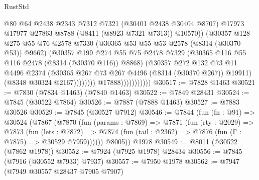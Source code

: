\begin{lexlean}{RustStd}
\begin{coremodule}
                                      @80
                                      @64
                                      @2438
                                      @2343
                                      @7312
                                      @7321
                                      (@30401 @2438 @30404 @8707)
                                      @17973
                                      @17977
                                      @27863
                                      @8788
                                      (@8411 (@8923 @7321 @7313))
                                      @10570))
                                  (@30357
                                    @128
                                    @275
                                    @55
                                    @76
                                    @2578
                                    @7330
                                    (@30365 @53 @55 @53 @2578 (@8314 (@30370 @53)) @9662)
                                    (@30357
                                      @199
                                      @274
                                      @55
                                      @75
                                      @2478
                                      @7329
                                      (@30365 @116 @55 @116 @2478 (@8314 (@30370 @116)) @8868)
                                      (@30357
                                        @272
                                        @132
                                        @73
                                        @11
                                        @4496
                                        @2374
                                        (@30365 @267 @73 @267 @4496 (@8314 (@30370 @267)) @19911)
                                        (@8348 @30324 @2167))))))))
                          @17888)))))))))))
@30517 := @7828 @1463
@30521 := @7830 (@7834 @1463) (@7840 @1463)
@30522 := @7849 @28431
@30524 := @7845 (@30522 @7864)
@30526 := @7887 (@7888 @1463)
@30527 := @7883 @30526
@30529 := @7845 (@30527 @7912)
@30546 := @7844
    (fun (fn : @91) =>
    @30524
      (@7867
        (@7870
          (fun (params : @7869) =>
          @7871
            (fun (rty : @2029) =>
            @7873
              (fun (lets : @7872) =>
              @7874 (fun (tail : @2362) => @7876 (fun (Γ : @7875) => @30529 @7959))))))
        @8005))
    @1978
@30549 := @8011 (@30522 (@7862 @1978))
@30552 := @7924 (@7925 @1978) @28434
@30556 := @7845 (@7916 (@30552 @7933) @7937)
@30557 := @7950 @1978
@30562 := @7947 (@7949 @30557 @28437 @7905 @7907)

\end{coremodule}
\end{lexlean}
